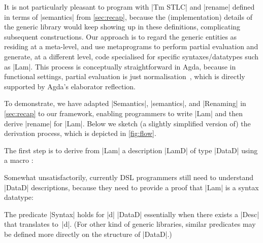 \documentclass[sigplan,review,fleqn]{acmart}
\renewcommand{\verb}{\collectverb{\color{AgdaFunction}}}
\newcommand{\name}{\collectverb{\it}}
\begin{document}
It is not particularly pleasant to program with \verb|Tm STLC| and \verb|rename| defined in terms of \verb|semantics| from \cref{sec:recap}, because the (implementation) details of the generic library would keep showing up in these definitions, complicating subsequent constructions.
Our approach is to regard the generic entities as residing at a meta-level, and use metaprograms to perform partial evaluation and generate, at a different level, code specialised for specific syntaxes/datatypes such as \verb|Lam|.
This process is conceptually straightforward in Agda, because in functional settings, partial evaluation is just normalisation~\citep{Filinski-semantic-partial-evaluation}, which is directly supported by Agda's elaborator reflection.

To demonstrate, we have adapted \verb|Semantics|, \verb|semantics|, and \verb|Renaming| in \cref{sec:recap} to our framework, enabling programmers to write \verb|Lam| and then derive \verb|rename| for \verb|Lam|.
Below we sketch (a slightly simplified version of) the derivation process, which is depicted in \cref{fig:flow}.

The first step is to derive from \verb|Lam| a description \verb|LamD| of type \verb|DataD| using a macro :
\begin{code}
	\>[0]\AgdaSpace{}%
	\AgdaSymbol{=}\AgdaSpace{}%
	\AgdaSpace{}%
	\<%
\end{code}
Somewhat unsatisfactorily, currently DSL programmers still need to understand \verb|DataD| descriptions, because they need to provide a proof that \verb|Lam| is a syntax datatype:
\begin{code}
\>\AgdaSpace{}\AgdaSymbol{:}\AgdaSpace{}\AgdaSpace{}\<
\end{code}
The predicate \verb|Syntax| holds for \name|d| \AgdaSymbol{:} \verb|DataD| essentially when there exists a \verb|Desc| that translates to~\name|d|.
(For other kind of generic libraries, similar predicates may be defined more directly on the structure of \verb|DataD|.)


\end{document}
